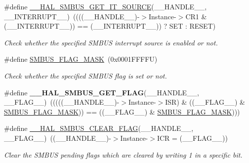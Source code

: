 \begin{DoxyCompactItemize}
\#define \hyperlink{group___s_m_b_u_s___exported___macros_gae0997d3a0cda636c87cab9d2e2362dcf}{\+\_\+\+\_\+\+H\+A\+L\+\_\+\+S\+M\+B\+U\+S\+\_\+\+G\+E\+T\+\_\+\+I\+T\+\_\+\+S\+O\+U\+R\+CE}(\+\_\+\+\_\+\+H\+A\+N\+D\+L\+E\+\_\+\+\_\+,  \+\_\+\+\_\+\+I\+N\+T\+E\+R\+R\+U\+P\+T\+\_\+\+\_\+)~((((\+\_\+\+\_\+\+H\+A\+N\+D\+L\+E\+\_\+\+\_\+)-\/$>$Instance-\/$>$C\+R1 \& (\+\_\+\+\_\+\+I\+N\+T\+E\+R\+R\+U\+P\+T\+\_\+\+\_\+)) == (\+\_\+\+\_\+\+I\+N\+T\+E\+R\+R\+U\+P\+T\+\_\+\+\_\+)) ? S\+ET \+: R\+E\+S\+ET)
\begin{DoxyCompactList}\small\item\em Check whether the specified S\+M\+B\+US interrupt source is enabled or not. \end{DoxyCompactList}\item 
\#define \hyperlink{group___s_m_b_u_s___exported___macros_gabcc8df77313f2c6eb892d197da66a79e}{S\+M\+B\+U\+S\+\_\+\+F\+L\+A\+G\+\_\+\+M\+A\+SK}~(0x0001\+F\+F\+F\+F\+U)
\begin{DoxyCompactList}\small\item\em Check whether the specified S\+M\+B\+US flag is set or not. \end{DoxyCompactList}\item 
\mbox{\label{group___s_m_b_u_s___exported___macros_ga2beb26cbf2f721fb3f50234121f5362e}} 
\#define {\bfseries \+\_\+\+\_\+\+H\+A\+L\+\_\+\+S\+M\+B\+U\+S\+\_\+\+G\+E\+T\+\_\+\+F\+L\+AG}(\+\_\+\+\_\+\+H\+A\+N\+D\+L\+E\+\_\+\+\_\+,  \+\_\+\+\_\+\+F\+L\+A\+G\+\_\+\+\_\+)~(((((\+\_\+\+\_\+\+H\+A\+N\+D\+L\+E\+\_\+\+\_\+)-\/$>$Instance-\/$>$I\+SR) \& ((\+\_\+\+\_\+\+F\+L\+A\+G\+\_\+\+\_\+) \& \hyperlink{group___s_m_b_u_s___exported___macros_gabcc8df77313f2c6eb892d197da66a79e}{S\+M\+B\+U\+S\+\_\+\+F\+L\+A\+G\+\_\+\+M\+A\+SK})) == ((\+\_\+\+\_\+\+F\+L\+A\+G\+\_\+\+\_\+) \& \hyperlink{group___s_m_b_u_s___exported___macros_gabcc8df77313f2c6eb892d197da66a79e}{S\+M\+B\+U\+S\+\_\+\+F\+L\+A\+G\+\_\+\+M\+A\+SK})))
\item 
\#define \hyperlink{group___s_m_b_u_s___exported___macros_gab4d14f4ae53d4e51b5fb90f3dedfe71e}{\+\_\+\+\_\+\+H\+A\+L\+\_\+\+S\+M\+B\+U\+S\+\_\+\+C\+L\+E\+A\+R\+\_\+\+F\+L\+AG}(\+\_\+\+\_\+\+H\+A\+N\+D\+L\+E\+\_\+\+\_\+,  \+\_\+\+\_\+\+F\+L\+A\+G\+\_\+\+\_\+)~((\+\_\+\+\_\+\+H\+A\+N\+D\+L\+E\+\_\+\+\_\+)-\/$>$Instance-\/$>$I\+CR = (\+\_\+\+\_\+\+F\+L\+A\+G\+\_\+\+\_\+))
\begin{DoxyCompactList}\small\item\em Clear the S\+M\+B\+US pending flags which are cleared by writing 1 in a specific bit. \end{DoxyCompactList}\item 

\end{DoxyCompactItemize}
